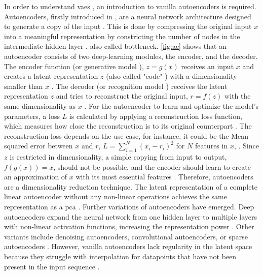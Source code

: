 In order to understand \glspl{vae} \cite{kingma2013AutoEncodingVariationalBayes}, an introduction to vanilla autoencoders is required.
Autoencoders, firstly introduced in \cite{rumelhart1986LearningInternalRepresentations}, are a neural network architecture designed to generate a copy of the input \cite{Goodfellow-et-al-2016, Bank2020Autoencoders}.
This is done by compressing the original input $x$ into a meaningful representation by constricting the number of nodes in the intermediate hidden layer \cite{aggarwal2018NeuralNetworksDeep, Bank2020Autoencoders}, also called bottleneck.
\autoref{fig:ae} shows that an autoencoder consists of two deep-learning modules, the encoder, and the decoder.
The encoder function (or generative model \cite{kingma2019IntroductionVariationalAutoencoders}), $z=g(x)$ receives an input $x$ and creates a latent representation $z$ (also called "code" \cite{aggarwal2018NeuralNetworksDeep}) with a dimensionality smaller than $x$ \cite{Goodfellow-et-al-2016, Bank2020Autoencoders}.
The decoder (or recognition model \cite{kingma2019IntroductionVariationalAutoencoders}) receives the latent representation $z$ and tries to reconstruct the original input, $r=f(z)$ with the same dimensionality as $x$ \cite{Goodfellow-et-al-2016}.
For the autoencoder to learn and optimize the model's parameters, a loss $L$ is calculated by applying a reconstruction loss function, which measures how close the reconstruction is to its original counterpart \cite{Bank2020Autoencoders, maheshwari2022AutoencoderIssuesChallenges}.
The reconstruction loss depends on the use case, for instance, it could be the Mean-squared error between $x$ and $r$, $L=\sum_{i=1}^{N}(x_i-r_i)^2$ for $N$ features in $x$, \cite{aggarwal2018NeuralNetworksDeep, Goodfellow-et-al-2016}.
Since $z$ is restricted in dimensionality, a simple copying from input to output, \ie $f(g(x))=x$, should not be possible, and the encoder should learn to create an approximation of $x$ with its most essential features \cite{aggarwal2018NeuralNetworksDeep}.
Therefore, autoencoders are a dimensionality reduction technique.
The latent representation of a complete linear autoencoder without any non-linear operations achieves the same representation as a \gls{pca} \cite{plaut2018PrincipalSubspacesPrincipal, Bank2020Autoencoders}.
Further variations of autoencoders have emerged.
Deep autoencoders expand the neural network from one hidden layer to multiple layers with non-linear activation functions, increasing the representation power \cite{aggarwal2018NeuralNetworksDeep}.
Other variants include denoising autoencoders, convolutional autoencoders, or sparse autoencoders \cite{maheshwari2022AutoencoderIssuesChallenges, Goodfellow-et-al-2016}.
However, vanilla autoencoders lack regularity in the latent space because they struggle with interpolation for datapoints that have not been present in the input sequence \cite{razghandi2022VariationalAutoencoderGenerativea}.

